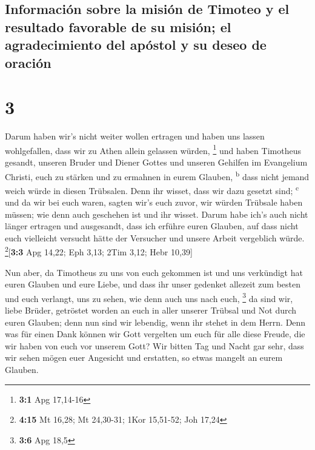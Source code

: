 \hypertarget{informaciuxf3n-sobre-la-misiuxf3n-de-timoteo-y-el-resultado-favorable-de-su-misiuxf3n-el-agradecimiento-del-apuxf3stol-y-su-deseo-de-oraciuxf3n}{%
\subsection{Información sobre la misión de Timoteo y el resultado
favorable de su misión; el agradecimiento del apóstol y su deseo de
oración}\label{informaciuxf3n-sobre-la-misiuxf3n-de-timoteo-y-el-resultado-favorable-de-su-misiuxf3n-el-agradecimiento-del-apuxf3stol-y-su-deseo-de-oraciuxf3n}}

\hypertarget{section-2}{%
\section{3}\label{section-2}}

 Darum haben wir's nicht weiter wollen ertragen und haben
uns lassen wohlgefallen, dass wir zu Athen allein gelassen würden,
\footnote{\textbf{3:1} Apg 17,14-16}  und haben Timotheus
gesandt, unseren Bruder und Diener Gottes und unseren Gehilfen im
Evangelium Christi, euch zu stärken und zu ermahnen in eurem Glauben,
\textsuperscript{b}  dass nicht jemand weich würde in
diesen Trübsalen. Denn ihr wisset, dass wir dazu gesetzt sind;
\textsuperscript{c}  und da wir bei euch waren, sagten
wir's euch zuvor, wir würden Trübsale haben müssen; wie denn auch
geschehen ist und ihr wisset.  Darum habe ich's auch nicht
länger ertragen und ausgesandt, dass ich erführe euren Glauben, auf dass
nicht euch vielleicht versucht hätte der Versucher und unsere Arbeit
vergeblich würde. \footnote{\textbf{4:15} Mt 16,28; Mt 24,30-31; 1Kor
  15,51-52; Joh 17,24}{[}\textbf{3:3} Apg 14,22; Eph 3,13; 2Tim 3,12;
Hebr 10,39{]}

 Nun aber, da Timotheus zu uns von euch gekommen ist und
uns verkündigt hat euren Glauben und eure Liebe, und dass ihr unser
gedenket allezeit zum besten und euch verlangt, uns zu sehen, wie denn
auch uns nach euch, \footnote{\textbf{3:6} Apg 18,5}  da
sind wir, liebe Brüder, getröstet worden an euch in aller unserer
Trübsal und Not durch euren Glauben;  denn nun sind wir
lebendig, wenn ihr stehet in dem Herrn.  Denn was für
einen Dank können wir Gott vergelten um euch für alle diese Freude, die
wir haben von euch vor unserem Gott?  Wir bitten Tag und
Nacht gar sehr, dass wir sehen mögen euer Angesicht und erstatten, so
etwas mangelt an eurem Glauben.

